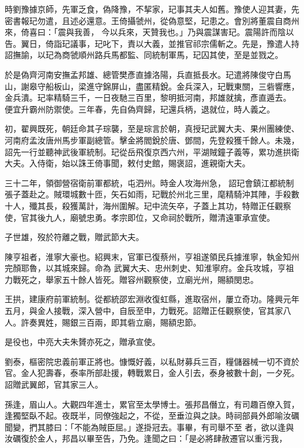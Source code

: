 \begin{pinyinscope}
 時劉豫據京師，先軍乏食，偽降豫，不挈家，玘事其夫人如舊。豫使人迎其妻，先密書報玘勿遣，且述必還意。王倚攝虢州，從偽意堅，玘患之。會別將董震自商州來，倚喜曰：「震與我善，
 今以兵來，天贊我也。」乃與震謀害玘。震陽許而陰以告。翼日，倚詣玘議事，玘叱下，責以大義，並推官祁宗儒斬之。先是，豫遣人持詔撫諭，以玘為商虢順州路兵馬都監、同統制軍馬，玘囚其使，至是並戮之。



 於是偽齊河南安撫孟邦雄、總管樊彥直據洛陽，兵直抵長水。玘遣將陳俊守白馬山，謝皋守船板山，梁進守錦屏山，盡匿精銳。金兵深入，玘戰東關，三砦響應，金兵潰。玘率精騎三千，一日夜馳三百里，黎明抵河南，邦雄就擒，彥直遁去。
 便宜升霸州防禦使。三年春，先自偽齊歸，玘還兵柄，退就位，時人義之。



 初，翟興既死，朝廷命其子琮襲，至是琮言於朝，真授玘武翼大夫、果州團練使、河南府孟汝唐州馬步軍副總管。擊金將閻銳於唐、鄧間，先登殺獲千餘人。未幾，詔先一行並聽神武後軍統制。玘從岳飛復京西六州，平湖賊鐘子義等，累功進拱衛大夫。入侍衛，始以誅王倚事聞，敕付史館，賜褒詔，進親衛大夫。



 三十二年，領御營宿衛前軍都統，屯泗州。時金人攻海州急，
 詔玘會鎮江都統制張子蓋赴之。賊環城數十匝，矢石如雨，玘戰於州北三里，麾精騎沖其陣，手殺數十人，殲其長，殺獲萬計，海州圍解。玘中流矢卒，子蓋上其功，特贈正任觀察使，官其後九人，廟號忠勇。孝宗即位，又命祠於戰所，贈清遠軍承宣使。



 子世雄，歿於符離之戰，贈武節大夫。



 陳亨祖者，淮寧大豪也。紹興末，官軍已復蔡州，亨祖遂領民兵據淮寧，執金知州完顏耶魯，以其城來歸。命為
 武翼大夫、忠州刺史、知淮寧府。金兵攻城，亨祖力戰死之，舉家五十餘人皆死。贈容州觀察使，立廟光州，賜額閔忠。



 王拱，建康府前軍統制。從都統邵宏淵收復虹縣，進取宿州，屢立奇功。隆興元年五月，與金人接戰，深入營中，自辰至申，力戰死。詔贈正任觀察使，官其家八人。許奏異姓，賜銀三百兩，即其砦立廟，賜額忠節。



 是役也，中亮大夫朱贇亦死之，贈承宣使。



 劉泰，樞密院忠義前軍正將也。慷慨好義，以私財募兵三百，糧儲器械一切不資於官。金人犯壽春，泰率所部赴援，轉戰累日，金人引去，泰身被數十創，一夕死。詔贈武翼郎，官其家三人。



 孫逢，眉山人。大觀四年進士，累官至太學博士。張邦昌僭立，有司趣百僚入賀，逢獨堅臥不起。夜既半，同僚強起之，不從，至垂泣與之訣。時祠部員外郎喻汝礪聞變，捫其膝曰：「不能為賊臣屈。」遂掛冠去。事畢，有司舉不至
 者，欲以逢與汝礪復於金人，邦昌以畢至告，乃免。逢聞之曰：「是必將肆赦遷官以重污我，




\end{pinyinscope}
